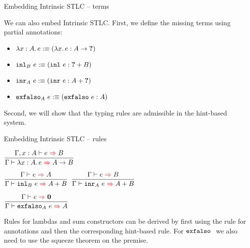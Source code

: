 \documentclass{beamer}
\begin{document}
\begin{frame}{Embedding Intrinsic STLC -- terms}

We can also embed Intrinsic STLC. First, we define the missing terms using partial annotations:

\begin{itemize}
  \item $\lambda x : A.\, e :\equiv (\lambda x.\, e : A \to \textbf{?})$ \\
  \item $\texttt{inl}_{B}\ e :\equiv (\texttt{inl}\ e : \textbf{?} + B)$ \\
  \item $\texttt{inr}_{A}\ e :\equiv (\texttt{inr}\ e : A + \textbf{?})$ \\
  \item $\texttt{exfalso}_{A}\ e :\equiv (\texttt{exfalso}\ e : A)$
\end{itemize}

\vspace{2em}

Second, we will show that the typing rules are admissible in the hint-based system.

\end{frame}

\begin{frame}{Embedding Intrinsic STLC -- rules}

\begin{center}
  $\infrule{\fullinfer{\extend{\Gamma}{x}{A}}{e}{B}}{\infer{\ifun{x}{A}{e}}{\Fun{A}{B}}}$

  \vspace{2em}

  $\infrule{\infer{e}{A}}{\infer{\iinl{B}{e}}{\Sum{A}{B}}}$ \quad
  $\infrule{\infer{e}{B}}{\infer{\iinr{A}{e}}{\Sum{A}{B}}}$

  \vspace{2em}

  $\infrule{\infer{e}{\Empty}}{\infer{\iexfalso{A}{e}}{A}}$
\end{center}

\vspace{2em}

Rules for lambdas and sum constructors can be derived by first using the rule for annotations and then the corresponding hint-based rule. For $\texttt{exfalso}\ $ we also need to use the squeeze theorem on the premise.

\end{frame}
\end{document}
